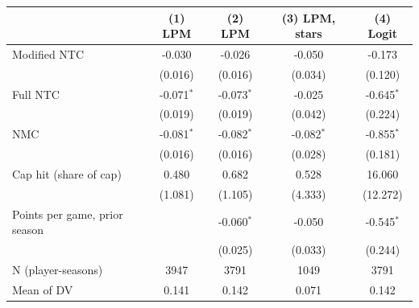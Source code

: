 \begin{tabular}{lcccc}\toprule
 & (1) LPM & (2) LPM & (3) LPM, stars & (4) Logit\\\midrule
Modified NTC & -0.030 & -0.026 & -0.050 & -0.173\\
 & (0.016) & (0.016) & (0.034) & (0.120)\\
Full NTC & -0.071$^{*}$ & -0.073$^{*}$ & -0.025 & -0.645$^{*}$\\
 & (0.019) & (0.019) & (0.042) & (0.224)\\
NMC & -0.081$^{*}$ & -0.082$^{*}$ & -0.082$^{*}$ & -0.855$^{*}$\\
 & (0.016) & (0.016) & (0.028) & (0.181)\\
Cap hit (share of cap) & 0.480 & 0.682 & 0.528 & 16.060\\
 & (1.081) & (1.105) & (4.333) & (12.272)\\
Points per game, prior season &  & -0.060$^{*}$ & -0.050 & -0.545$^{*}$\\
 &  & (0.025) & (0.033) & (0.244)\\
N (player-seasons) & 3947 & 3791 & 1049 & 3791\\
Mean of DV & 0.141 & 0.142 & 0.071 & 0.142\\
\bottomrule\end{tabular}